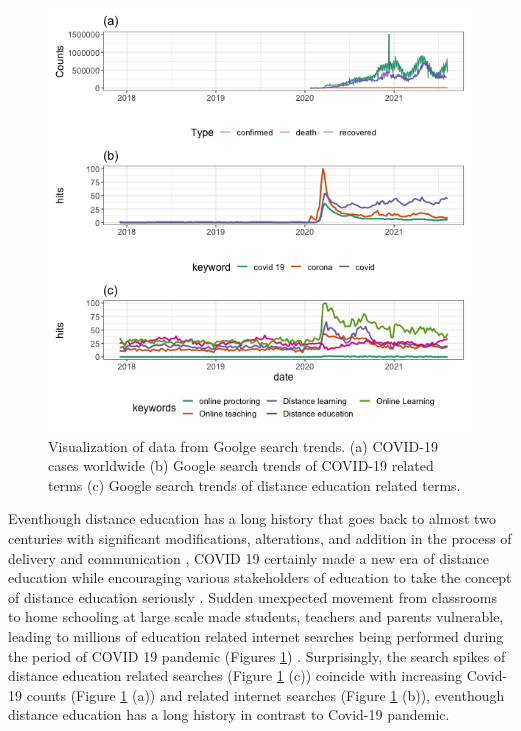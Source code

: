 \documentclass[11pt,a4paper,]{article}
\begin{document}
\begin{figure}[h]

{\centering \includegraphics[width=1\textwidth]{figure/distanceLearningWorldAnalysis-1} 

}

\caption{Visualization of data from Goolge search trends. (a) COVID-19 cases worldwide (b) Google search trends of COVID-19 related terms (c) Google search trends of distance education related terms.}\label{fig:distanceLearningWorldAnalysis}
\end{figure}

Eventhough distance education has a long history that goes back to almost two centuries with significant modifications,
alterations, and addition in the process of delivery and communication \autocite{moore2011learning,spector2014handbook}, COVID 19 certainly made a new era of distance education while encouraging various stakeholders of education to take the concept of distance education seriously \autocite{richmond2020critical}. Sudden unexpected movement from classrooms to home schooling at large scale made students, teachers and parents vulnerable, leading to millions of education related internet searches being performed during the period of COVID 19 pandemic (Figures \ref{fig:distanceLearningWorldAnalysis}) \autocite{carter2021teacher}. Surprisingly, the search spikes of distance education related searches (Figure \ref{fig:distanceLearningWorldAnalysis} (c)) coincide with increasing Covid-19 counts (Figure \ref{fig:distanceLearningWorldAnalysis} (a)) and related internet searches (Figure \ref{fig:distanceLearningWorldAnalysis} (b)), eventhough distance education has a long history in contrast to Covid-19 pandemic.
\end{document}
